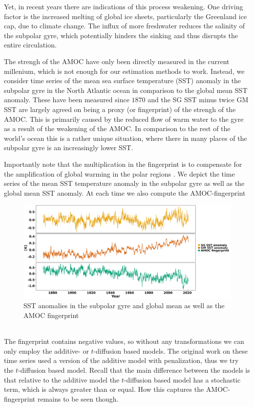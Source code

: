 Yet, in recent years there are indications of this process weakening. One driving factor is the increased melting of global ice sheets, particularly the Greenland ice cap, due to climate change. The influx of more freshwater reduces the salinity of the subpolar gyre, which potentially hinders the sinking and thus disrupts the entire circulation. 

The strengh of the AMOC have only been directly measured in the current millenium, which is not enough for our estimation methods to work. Instead, we consider time series of the mean sea surface temperature (SST) anomaly in the subpolar gyre in the North Atlantic ocean in comparison to the global mean SST anomaly. These have been measured since $1870$ and the SG SST minus twice GM SST are largely agreed on being a proxy (or fingerprint) of the strengh of the AMOC. This is primarily caused by the reduced flow of warm water to the gyre as a result of the weakening of the AMOC. In comparison to the rest of the world's ocean this is a rather unique situation, where there in many places of the subpolar gyre is an increasingly lower SST. 

Importantly note that the multiplication in the fingerprint is to compensate for the amplification of global warming in the polar regions \cite[caption of figure 1]{Ditlevsen2023}. We depict the time series of the mean SST temperature anomaly in the subpolar gyre as well as the global mean SST anomaly. At each time we also compute the AMOC-fingerprint
\begin{figure}[h!]
    \begin{center}
    \includegraphics[scale = .06]{figures/AMOC_data_plot.jpeg}
    \caption{SST anomalies in the subpolar gyre and global mean as well as the AMOC fingerprint}
    \label{figure:AMOC_plot}
    \end{center}
\end{figure}\\
The fingerprint contains negative values, so without any transformations we can only employ the additive- or $t$-diffusion based models. The original work on these time series \cite{Ditlevsen2023} used a version of the additive model with penalization, thus we try the $t$-diffusion based model. Recall that the main difference between the models is that relative to the additive model the $t$-diffusion based model has a stochastic term, which is always greater than or equal. How this captures the AMOC-fingerprint remains to be seen though.
